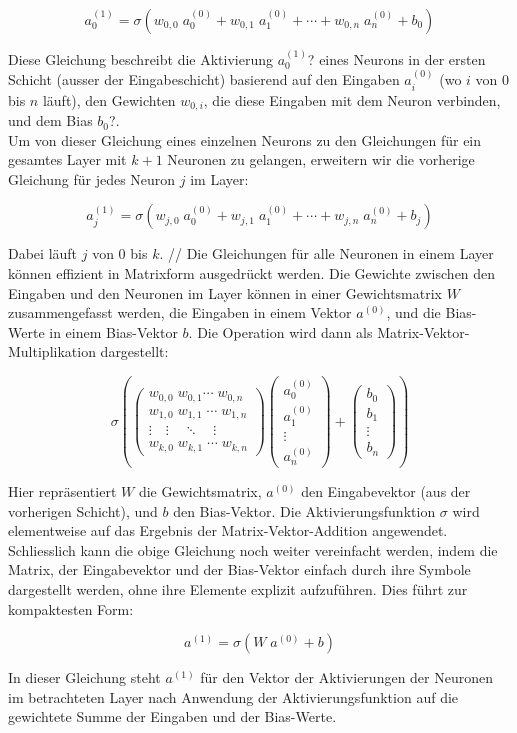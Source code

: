 \[a_{0}^{(1)} = \sigma(w_{0,0}\; a_{0}^{(0)} + w_{0,1}\; a_{1}^{(0)} + \cdots + w_{0,n}\; a_{n} ^{(0)} + b_{0})\]

\noindent Diese Gleichung beschreibt die Aktivierung $a_0^{(1)}$? eines Neurons in der ersten Schicht (ausser der Eingabeschicht) basierend auf den Eingaben $a_{i}^{(0)}$ (wo $i$ von $0$ bis $n$ läuft), den Gewichten $w_{0,i}$, die diese Eingaben mit dem Neuron verbinden, und dem Bias $b_0$?.
\\
Um von dieser Gleichung eines einzelnen Neurons zu den Gleichungen für ein gesamtes Layer mit $k+1$ Neuronen zu gelangen, erweitern wir die vorherige Gleichung für jedes Neuron $j$ im Layer:

\[a_j^{(1)}=\sigma(w_{j,0}\; a_0^{(0)} + w_{j,1}\; a_1^{(0)} + \cdots + w_{j,n}\; a_n^{(0)} + b_j)\]

\noindent Dabei läuft $j$ von $0$ bis $k$.
//
Die Gleichungen für alle Neuronen in einem Layer können effizient in Matrixform ausgedrückt werden. Die Gewichte zwischen den Eingaben und den Neuronen im Layer können in einer Gewichtsmatrix $W$ zusammengefasst werden, die Eingaben in einem Vektor $a^(0)$, und die Bias-Werte in einem Bias-Vektor $b$. Die Operation wird dann als Matrix-Vektor-Multiplikation dargestellt:

\[\sigma(\left(\begin{array}{c} w_{0,0}\; w_{0,1}\! \cdots\; w_{0,n} \\ w_{1,0}\; w_{1,1}\; \cdots\; w_{1,n} \\ \vdots\quad  \vdots\quad  \ddots\quad  \vdots \\ w_{k,0}\; w_{k,1}\; \cdots\; w_{k,n}  \end{array}\right) \left(\begin{array}{c} a_{0} ^{(0)} \\ a_{1}^{(0)} \\ \vdots \\ a_{n}^{(0)} \end{array}\right) + \left(\begin{array}{c} b_{0} \\ b_{1} \\ \vdots \\ b_{n} \end{array}\right))\]

\noindent Hier repräsentiert $W$ die Gewichtsmatrix, $a^(0)$ den Eingabevektor (aus der vorherigen Schicht), und $b$ den Bias-Vektor. Die Aktivierungsfunktion $\sigma$ wird elementweise auf das Ergebnis der Matrix-Vektor-Addition angewendet.
\\
Schliesslich kann die obige Gleichung noch weiter vereinfacht werden, indem die Matrix, der Eingabevektor und der Bias-Vektor einfach durch ihre Symbole dargestellt werden, ohne ihre Elemente explizit aufzuführen. Dies führt zur kompaktesten Form:

\[a^{(1)} = \sigma(W\; a^{(0)} + b)\]

\noindent In dieser Gleichung steht $a^(1)$ für den Vektor der Aktivierungen der Neuronen im betrachteten Layer nach Anwendung der Aktivierungsfunktion auf die gewichtete Summe der Eingaben und der Bias-Werte.

